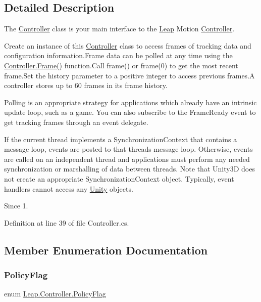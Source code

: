 \subsection{Detailed Description}
The \mbox{\hyperlink{class_leap_1_1_controller}{Controller}} class is your main interface to the \mbox{\hyperlink{namespace_leap}{Leap}} Motion \mbox{\hyperlink{class_leap_1_1_controller}{Controller}}. 

Create an instance of this \mbox{\hyperlink{class_leap_1_1_controller}{Controller}} class to access frames of tracking data and configuration information.\+Frame data can be polled at any time using the \mbox{\hyperlink{class_leap_1_1_controller_ac41dc9c50a3bd2a892cc44af0859ef0d}{Controller.\+Frame()}} function.\+Call frame() or frame(0) to get the most recent frame.\+Set the history parameter to a positive integer to access previous frames.\+A controller stores up to 60 frames in its frame history.

Polling is an appropriate strategy for applications which already have an intrinsic update loop, such as a game. You can also subscribe to the Frame\+Ready event to get tracking frames through an event delegate.

If the current thread implements a Synchronization\+Context that contains a message loop, events are posted to that threads message loop. Otherwise, events are called on an independent thread and applications must perform any needed synchronization or marshalling of data between threads. Note that Unity3D does not create an appropriate Synchronization\+Context object. Typically, event handlers cannot access any \mbox{\hyperlink{namespace_leap_1_1_unity}{Unity}} objects.

\begin{DoxySince}{Since}
1. 
\end{DoxySince}


Definition at line 39 of file Controller.\+cs.



\subsection{Member Enumeration Documentation}
\mbox{\label{class_leap_1_1_controller_a0bdb49fa94aa2da8b098c1ac296528d6}} 
\subsubsection{\texorpdfstring{PolicyFlag}{PolicyFlag}}
{\footnotesize\ttfamily enum \mbox{\hyperlink{class_leap_1_1_controller_a0bdb49fa94aa2da8b098c1ac296528d6}{Leap.\+Controller.\+Policy\+Flag}}\hspace{0.3cm}{\ttfamily [strong]}}



